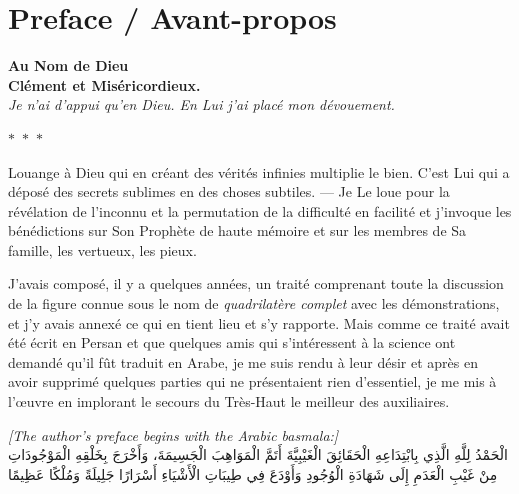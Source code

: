 \documentclass[11pt,a4paper]{article}
\theoremstyle{plain}
\theoremstyle{definition}
\theoremstyle{remark}
\newcommand{\ar}[1]{{\arabicfont\beginR #1\endR}}
\newcommand{\ornament}{\begin{center}\textcolor{goldaccent}{$\ast$~$\ast$~$\ast$}\end{center}}
\begin{document}
\tableofcontents
\clearpage

\section*{Preface / Avant-propos}

\begin{center}
\textbf{\Large Au Nom de Dieu}\\[0.2cm]
\textbf{\large Clément et Miséricordieux.}\\[0.3cm]
\textit{Je n'ai d'appui qu'en Dieu. En Lui j'ai placé mon dévouement.}
\end{center}

\ornament


Louange à Dieu qui en créant des vérités infinies multiplie le bien. C'est Lui qui a déposé des secrets sublimes en des choses subtiles. --- Je Le loue pour la révélation de l'inconnu et la permutation de la difficulté en facilité et j'invoque les bénédictions sur Son Prophète de haute mémoire et sur les membres de Sa famille, les vertueux, les pieux.

J'avais composé, il y a quelques années, un traité comprenant toute la discussion de la figure connue sous le nom de \textit{quadrilatère complet} avec les démonstrations, et j'y avais annexé ce qui en tient lieu et s'y rapporte. Mais comme ce traité avait été écrit en Persan et que quelques amis qui s'intéressent à la science ont demandé qu'il fût traduit en Arabe, je me suis rendu à leur désir et après en avoir supprimé quelques parties qui ne présentaient rien d'essentiel, je me mis à l'œuvre en implorant le secours du Très-Haut le meilleur des auxiliaires.


\vspace{0.5cm}
\noindent\textcolor{notecolor}{\textit{[The author's preface begins with the Arabic basmala:]}}\\
\ar{الْحَمْدُ لِلَّهِ الَّذِي بِابْتِدَاعِهِ الْحَقَائِقَ الْغَيْبِيَّةَ أَتَمَّ الْمَوَاهِبَ الْجَسِيمَةَ، وَأَخْرَجَ بِخَلْقِهِ الْمَوْجُودَاتِ مِنْ غَيْبِ الْعَدَمِ إِلَى شَهَادَةِ الْوُجُودِ وَأَوْدَعَ فِي طِيبَاتِ الْأَشْيَاءِ أَسْرَارًا جَلِيلَةً وَمُلْكًا عَظِيمًا}
\end{document}
